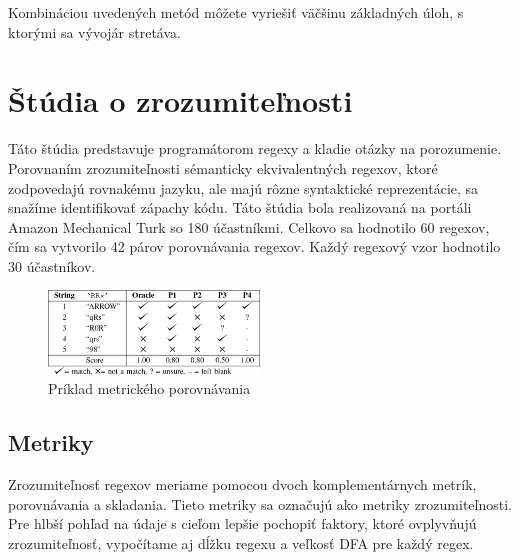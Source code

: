 \documentclass[10pt,twoside,slovak,a4paper]{article}
\begin{document}
Kombináciou uvedených metód môžete vyriešiť väčšinu základných úloh, s ktorými sa vývojár stretáva.

\section{Štúdia o zrozumiteľnosti}
Táto štúdia predstavuje programátorom regexy a kladie otázky na porozumenie. Porovnaním zrozumiteľnosti sémanticky ekvivalentných regexov, ktoré zodpovedajú rovnakému jazyku, ale majú rôzne syntaktické reprezentácie, sa snažíme identifikovať zápachy kódu. Táto štúdia bola realizovaná na portáli Amazon Mechanical Turk so 180 účastníkmi. Celkovo sa hodnotilo 60 regexov, čím sa vytvorilo 42 párov porovnávania regexov. Každý regexový vzor hodnotilo 30 účastníkov. \cite{Chapman2017}
\begin{figure}[h]
	\centering
	\includegraphics[width=0.5\textwidth]{Table I.png}
	\caption{Príklad metrického porovnávania \cite{Chapman2017}}
	\label{fig:table1}
  \end{figure}
\subsection{Metriky}
Zrozumiteľnosť regexov meriame pomocou dvoch komplementárnych metrík, porovnávania a skladania. Tieto metriky sa označujú ako metriky zrozumiteľnosti. Pre hlbší pohľad na údaje s cieľom lepšie pochopiť faktory, ktoré ovplyvňujú zrozumiteľnosť, vypočítame aj dĺžku regexu a veľkosť DFA pre každý regex.\cite{Chapman2017}
\end{document}

